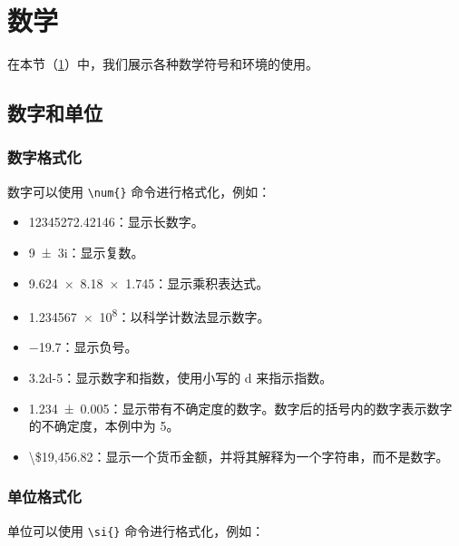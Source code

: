\section{数学}\label{sec:math}

在本节（\cref{sec:math}）中，我们展示各种数学符号和环境的使用。

\subsection{数字和单位}

\subsubsection*{数字格式化}

数字可以使用 \verb|\num{}| 命令进行格式化，例如：

\begin{itemize}
  \item \num{12345272.42146}：显示长数字。
  \item \num{9+-3i}：显示复数。
  \item \num{9.624 x 8.18 x 1.745}：显示乘积表达式。
  \item \num{1.234567e8}：以科学计数法显示数字。
  \item \num{-19.7}：显示负号。
  \item \num{3.2d-5}：显示数字和指数，使用小写的 d 来指示指数。
  \item \num{1.234(5)}：显示带有不确定度的数字。数字后的括号内的数字表示数字的不确定度，本例中为 5。
  \item \num[parse-numbers=false]{\$19,456.82}：显示一个货币金额，并将其解释为一个字符串，而不是数字。
\end{itemize}

\subsubsection*{单位格式化}

单位可以使用 \verb|\si{}| 命令进行格式化，例如：

